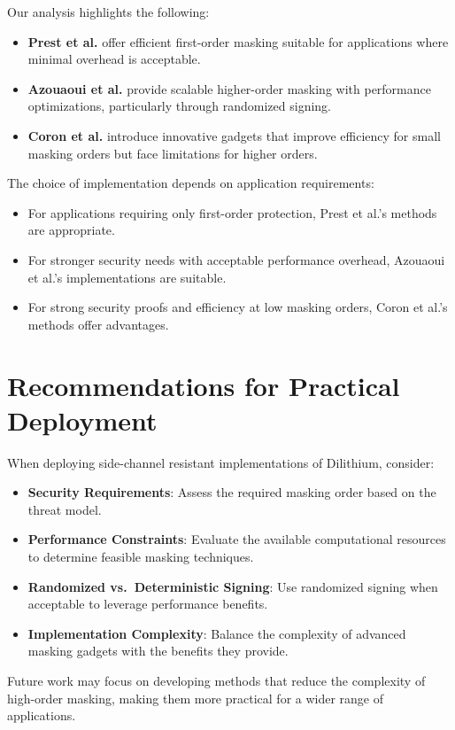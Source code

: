 Our analysis highlights the following:

\begin{itemize}
    \item \textbf{Prest et al.} offer efficient first-order masking suitable for applications where minimal overhead is acceptable.
    \item \textbf{Azouaoui et al.} provide scalable higher-order masking with performance optimizations, particularly through randomized signing.
    \item \textbf{Coron et al.} introduce innovative gadgets that improve efficiency for small masking orders but face limitations for higher orders.
\end{itemize}

The choice of implementation depends on application requirements:

\begin{itemize}
    \item For applications requiring only first-order protection, Prest et al.'s methods are appropriate.
    \item For stronger security needs with acceptable performance overhead, Azouaoui et al.'s implementations are suitable.
    \item For strong security proofs and efficiency at low masking orders, Coron et al.'s methods offer advantages.
\end{itemize}

\section{Recommendations for Practical Deployment}

When deploying side-channel resistant implementations of Dilithium, consider:

\begin{itemize}
    \item \textbf{Security Requirements}: Assess the required masking order based on the threat model.
    \item \textbf{Performance Constraints}: Evaluate the available computational resources to determine feasible masking techniques.
    \item \textbf{Randomized vs.\ Deterministic Signing}: Use randomized signing when acceptable to leverage performance benefits.
    \item \textbf{Implementation Complexity}: Balance the complexity of advanced masking gadgets with the benefits they provide.
\end{itemize}

Future work may focus on developing methods that reduce the complexity of high-order masking, making them more practical for a wider range of applications.

